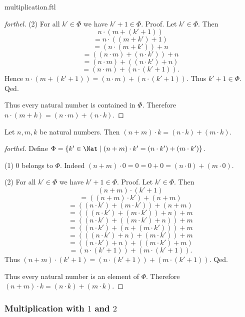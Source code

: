 \documentclass{naproche-library}
\begin{document}
\begin{smodule}{multiplication.ftl}
\begin{proof}[forthel]
    (2) For all $k' \in \Phi$ we have $k' + 1 \in \Phi$. \newline
    Proof.
      Let $k'\in \Phi$.
      Then
      \[  n \cdot (m + (k' + 1))                  \]
      \[    = n \cdot ((m + k') + 1)              \]
      \[    = (n \cdot (m + k')) + n              \]
      \[    = ((n \cdot m) + (n \cdot k')) + n    \]
      \[    = (n \cdot m) + ((n \cdot k') + n)    \]
      \[    = (n \cdot m) + (n \cdot (k' + 1)).   \]
      Hence $n \cdot (m + (k' + 1)) = (n \cdot m) + (n \cdot (k' + 1))$.
      Thus $k' + 1 \in \Phi$.
    Qed.

    Thus every natural number is contained in $\Phi$.
    Therefore $n \cdot (m + k) = (n \cdot m) + (n \cdot k)$.
  \end{proof}

  \begin{proposition}[forthel,id=ARITHMETIC_06_5742967566368768]
    Let $n, m, k$ be natural numbers.
    Then $(n + m) \cdot k = (n \cdot k) + (m \cdot k)$.
  \end{proposition}
  \begin{proof}[forthel]
    Define $\Phi = \{ k' \in \Nat \mid (n + m) \cdot k' = (n \cdot k') + (m \cdot k') \}$.

    (1) $0$ belongs to $\Phi$.
    Indeed $(n + m) \cdot 0
      = 0
      = 0 + 0
      = (n \cdot 0) + (m \cdot 0)$.

    (2) For all $k' \in \Phi$ we have $k' + 1 \in \Phi$. \newline
    Proof.
      Let $k' \in \Phi$.
      Then
      \[  (n + m) \cdot (k' + 1)                        \]
      \[    = ((n + m) \cdot k') + (n + m)              \]
      \[    = ((n \cdot k') + (m \cdot k')) + (n + m)   \]
      \[    = (((n \cdot k') + (m \cdot k')) + n) + m   \]
      \[    = ((n \cdot k') + ((m \cdot k') + n)) + m   \]
      \[    = ((n \cdot k') + (n + (m \cdot k'))) + m   \]
      \[    = (((n \cdot k') + n) + (m \cdot k')) + m   \]
      \[    = ((n \cdot k') + n) + ((m \cdot k') + m)   \]
      \[    = (n \cdot (k' + 1)) + (m \cdot (k' + 1)).  \]
      Thus $(n + m) \cdot (k' + 1) = (n \cdot (k' + 1)) + (m \cdot (k' + 1))$.
    Qed.

    Thus every natural number is an element of $\Phi$.
    Therefore $(n + m) \cdot k = (n \cdot k) + (m \cdot k)$.
  \end{proof}


  \subsubsection*{Multiplication with $1$ and $2$}


\end{smodule}
\end{document}
